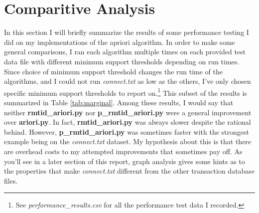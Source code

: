 \documentclass[12 pt]{article}
\begin{document}
\section{Comparitive Analysis}

In this section I will briefly summarize the results of some performance testing I did on my implementations of the apriori algorithm. In order to make some general comparisons, I ran each algorithm multiple times on each provided test data file with different minimum support thresholds depending on run times. Since choice of minimum support threshold changes the run time of the algorithms, and I could not run \textit{connect.txt} as low as the others, I've only chosen specific minimum support thresholds to report on.\footnote{See \textit{performance\_results.csv} for all the performance test data I recorded.} This subset of the results is summarized in Table \ref{tab:marginal}. Among these results, I would say that neither \textbf{rmtid\_ariori.py} nor \textbf{p\_rmtid\_ariori.py} were a general improvement over \textbf{ariori.py}. In fact, \textbf{rmtid\_ariori.py} was always slower despite the rational behind. However, \textbf{p\_rmtid\_ariori.py} was sometimes faster with the strongest example being on the \textit{connect.txt} dataset. My hypothesis about this is that there are overhead costs to my attempted improvements that sometimes pay off. As you'll see in a later section of this report, graph analysis gives some hints as to the properties that make \textit{connect.txt} different from the other transaction database files.
\end{document}
